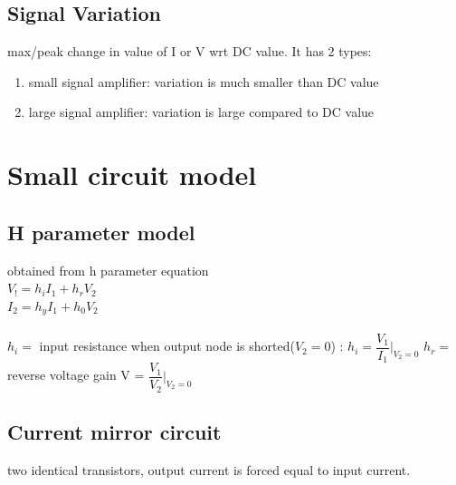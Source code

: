 \documentclass[10pt, a4paper]{report}
\begin{document}
	\subsection{Signal Variation}
	max/peak change in value of I or V wrt DC value. It has 2 types:
	\begin{enumerate}
		\item small signal amplifier: variation is much smaller than DC value
		\item large signal amplifier: variation is large compared to DC value
	\end{enumerate}

	\section{Small circuit model}
	\subsection{H parameter model}
	obtained from h parameter equation\\
	$ V_! = h_i I_1 + h_r V_2 $ \\
	$ I_2 = h_y I_1 + h_0 V_2 $ \\\\
	
	$ h_i =  $ input resistance when output node is shorted($ V_2 = 0 $) : $ h_i = \dfrac{V_1}{I_1}|_{V_2=0} $
	$ h_r =  $ reverse voltage gain V = $ \dfrac{V_1}{V_2}|_{V_2 = 0} $
	
	\subsection{Current mirror circuit}
	two identical transistors, output current is forced equal to input current.\\
	
	
\end{document}
